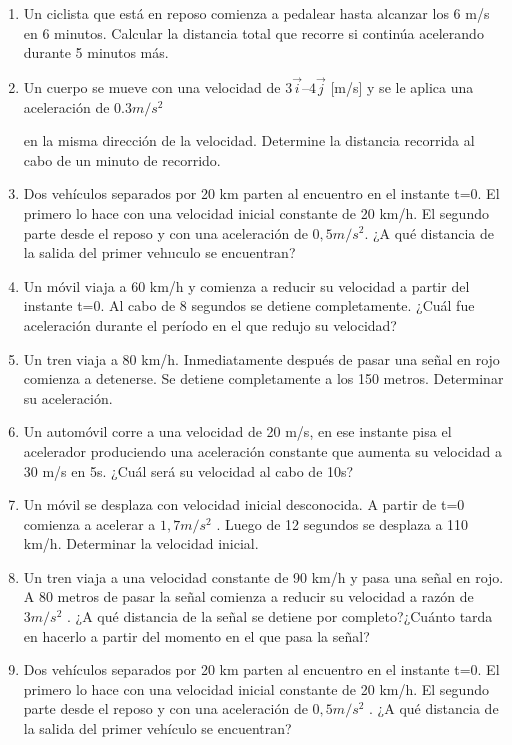 \documentclass[a5paper,pagesize,10pt,bibtotoc,pointlessnumbers,
normalheadings,DIV=9,fleqn,x11names,table,twoside=false]{scrbook}
\begin{document}
\begin{enumerate}
 \item Un ciclista que está en reposo comienza a pedalear hasta alcanzar los 6 m/s en 6 minutos. Calcular la distancia total que 
recorre si continúa acelerando durante 5 minutos más.

\item  Un cuerpo se mueve con una velocidad de $3 \vec{i} – 4\vec{j}$ [m/s] y
 se le aplica una aceleración de $0.3 m/s^2$

 en la misma dirección de la velocidad. Determine la
 distancia recorrida al cabo de un minuto de recorrido.

 
\item Dos vehículos separados por 20 km parten al encuentro
 en el instante t=0. El primero lo hace con una velocidad inicial 
constante de 20 km/h. El
 segundo parte desde el reposo y con una aceleración de $0,5 m/s^2$. ¿A qué distancia de la
 salida del 
primer vehııculo se encuentran? 

\item Un móvil viaja a 60 km/h y comienza a reducir su velocidad a partir del instante t=0. Al
 cabo de 8 segundos se detiene 
completamente. ¿Cuál fue aceleración durante el período en el que redujo su
 velocidad?

\item Un tren viaja a 80 km/h. Inmediatamente después de pasar una señal en rojo comienza a
 detenerse. Se detiene completamente 
a los 150 metros. Determinar su aceleración.

\item Un automóvil corre a una velocidad 
 de 20 m/s, en ese instante pisa el acelerador produciendo una aceleración constante 
que aumenta 
su velocidad a 30 m/s en 5s. ¿Cuál será su velocidad al cabo de 10s?

\item Un móvil se desplaza con velocidad inicial desconocida. A partir de t=0 comienza a acelerar
 a $1,7 m/s^2$
. Luego de 12 
segundos se desplaza a 110 km/h. Determinar la velocidad inicial.

\item Un tren viaja a una velocidad constante de 90 km/h y pasa una señal en rojo. A 80 metros
 de pasar la señal comienza a 
reducir su velocidad a razón de $3m/s^2$
. ¿A qué distancia de la señal se detiene
 por completo?¿Cuánto tarda en hacerlo a 
partir del momento en el que pasa la señal?

\item Dos vehículos separados por 20 km parten al encuentro en el instante t=0. El primero lo
 hace con una velocidad inicial 
constante de 20 km/h. El segundo parte desde el reposo y con una aceleración
 de $0,5 m/s^2$
 . ¿A qué distancia de la salida 
del primer vehículo se encuentran?


\end{enumerate}
\end{document}
